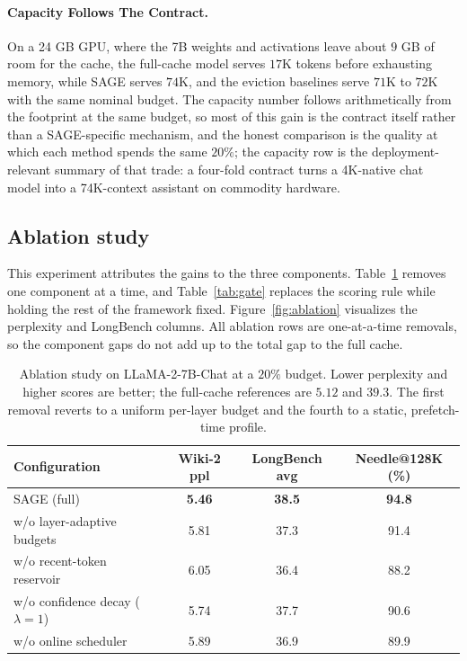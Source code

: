 \paragraph{Capacity Follows The Contract.}
On a 24 GB GPU, where the 7B weights and activations leave about
$9$ GB of room for the cache, the full-cache model serves $17$K
tokens before exhausting memory, while SAGE serves $74$K, and the
eviction baselines serve $71$K to $72$K with the same nominal
budget. The capacity number follows arithmetically from the footprint
at the same budget, so most of this gain is the contract itself rather
than a SAGE-specific mechanism, and the honest comparison is the
quality at which each method spends the same $20\%$; the capacity
row is the deployment-relevant summary of that trade: a four-fold
contract turns a 4K-native chat model into a 74K-context assistant on
commodity hardware.

\subsection{Ablation study}\label{sec:exp_ablation}

This experiment attributes the gains to the three components.
Table~\ref{tab:ablation} removes one component at a time, and
Table~\ref{tab:gate} replaces the scoring rule while holding the rest
of the framework fixed. Figure~\ref{fig:ablation} visualizes the
perplexity and LongBench columns. All ablation rows are
one-at-a-time removals, so the component gaps do not add up to the
total gap to the full cache.

\begin{table}[t]
\centering
\caption{Ablation study on LLaMA-2-7B-Chat at a $20\%$ budget. Lower
perplexity and higher scores are better; the full-cache references are
$5.12$ and $39.3$. The first removal reverts to a uniform per-layer
budget and the fourth to a static, prefetch-time profile.}
\label{tab:ablation}
\small
\begin{tabular*}{0.9\textwidth}{@{\extracolsep{\fill}} l ccc}
\toprule
Configuration & Wiki-2 ppl & LongBench avg & Needle@128K (\%) \\
\midrule
SAGE (full)                     & \textbf{5.46} & \textbf{38.5} & \textbf{94.8} \\
w/o layer-adaptive budgets      & 5.81 & 37.3 & 91.4 \\
w/o recent-token reservoir      & 6.05 & 36.4 & 88.2 \\
w/o confidence decay ($\lambda{=}1$) & 5.74 & 37.7 & 90.6 \\
w/o online scheduler           & 5.89 & 36.9 & 89.9 \\
\bottomrule
\end{tabular*}
\end{table}

